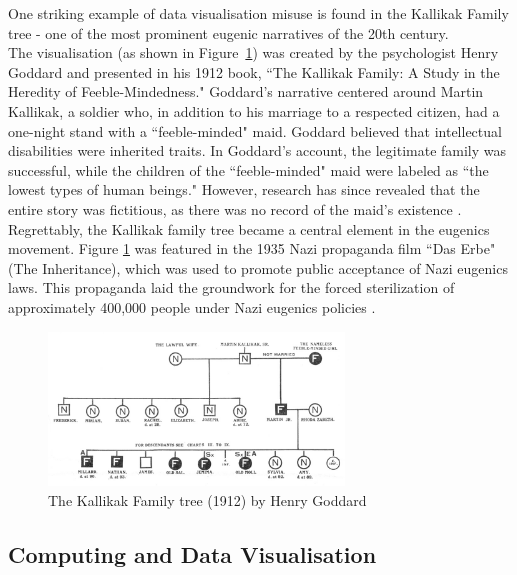 \documentclass{article}\usepackage[]{graphicx}\usepackage[]{xcolor}
\numberwithin{equation}{section}
\begin{document}
\noindent
One striking example of data visualisation misuse is found in the Kallikak Family tree - one of the most prominent eugenic narratives of the 20th century.\\

\noindent
The visualisation (as shown in Figure~\ref{fig:familytree}) was created by the psychologist Henry Goddard and presented in his 1912 book, ``The Kallikak Family: A Study in the Heredity of Feeble-Mindedness." Goddard's narrative centered around Martin Kallikak, a soldier who, in addition to his marriage to a respected citizen, had a one-night stand with a ``feeble-minded" maid. Goddard believed that intellectual disabilities were inherited traits. In Goddard's account, the legitimate family was successful, while the children of the ``feeble-minded" maid were labeled as ``the lowest types of human beings." However, research has since revealed that the entire story was fictitious, as there was no record of the maid's existence \cite{fakedata}.\\

\noindent
Regrettably, the Kallikak family tree became a central element in the eugenics movement. Figure \ref{fig:familytree} was featured in the 1935 Nazi propaganda film ``Das Erbe" (The Inheritance), which was used to promote public acceptance of Nazi eugenics laws. This propaganda laid the groundwork for the forced sterilization of approximately 400,000 people under Nazi eugenics policies \cite{eugenics}.

\begin{figure}[H]
    \centering
    \includegraphics[width=0.7\textwidth]{image_reference/familytree.jpg}
    \caption{The Kallikak Family tree (1912) by Henry Goddard \cite{ktree}}
    \label{fig:familytree}
\end{figure}

\subsection{Computing and Data Visualisation}
\end{document}

